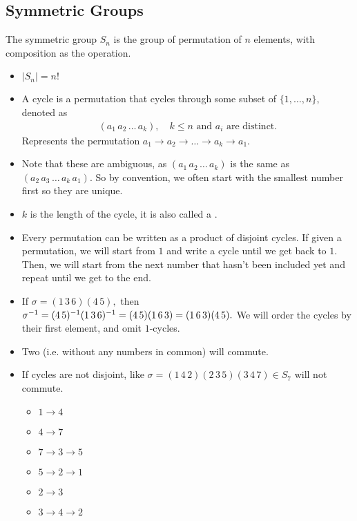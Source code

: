 \documentclass[a4paper]{article}
\begin{document}
\subsection{Symmetric Groups}
\begin{definition}
    The symmetric group $S_n$ is the group of permutation of $n$ elements, with composition as the operation.
\end{definition}
\begin{itemize}
    \item $|S_n|=n!$
    \item A cycle is a permutation that cycles through some subset of $\{1,\dots,n\}$, denoted as \begin{align}
        (a_1\,a_2\,\dots\,a_k),\quad k\leq n\text{ and }a_i\text{ are distinct.}
    \end{align}
    Represents the permutation $a_1\to a_2\to\dots\to a_k\to a_1.$
    \item Note that these are ambiguous, as $(a_1\,a_2\,\dots\,a_k)$ is the same as $(a_2\,a_3\,\dots\,a_k\,a_1).$ So by convention, we often start with the smallest number first so they are unique. 
    \item $k$ is the length of the cycle, it is also called a .
    \item Every permutation can be written as a product of disjoint cycles. If given a permutation, we will start from $1$ and write a cycle until we get back to $1.$ Then, we will start from the next number that hasn't been included yet and repeat until we get to the end.
    \item If $\sigma=(1\,3\,6)(4\,5),$ then $\sigma^{-1}=(4\,5)^{-1}(1\,3\,6)^{-1}=(4\,5)(1\,6\,3)=(1\,6\,3)(4\,5).$ We will order the cycles by their first element, and omit $1$-cycles.
    \item Two  (i.e. without any numbers in common) will commute.
    \item If cycles are not disjoint, like $\sigma=(1\,4\,2)(2\,3\,5)(3\,4\,7)\in S_7$ will not commute.
    \begin{itemize}
        \item $1\to4$
        \item $4\to7$
        \item $7\to3\to5$
        \item $5\to2\to1$
        \item $2\to3$
        \item $3\to4\to2$
    \end{itemize}

\end{itemize}
\end{document}

